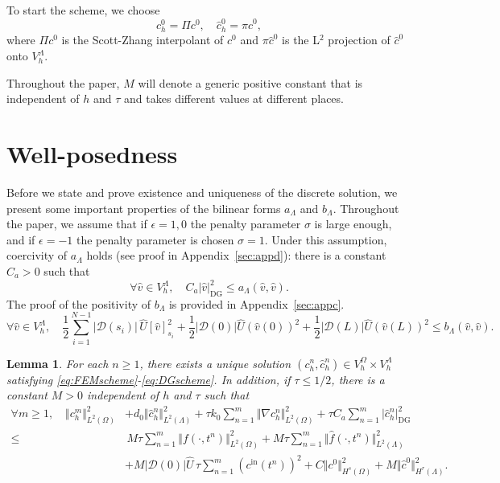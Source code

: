 \documentclass[pdflatex,sn-mathphys-num]{sn-jnl}%
\newcommand{\DG}{\mathrm{DG}}
\theoremstyle{thmstyleone}%
\newtheorem{lemma}[theorem]{Lemma}%
\theoremstyle{thmstyletwo}%
\theoremstyle{thmstylethree}%
\begin{document}
To start the scheme, we choose
\[
c_h^0 = \Pi c^0, \quad \hat c_h^0 = \pi \hat c^0,
\]
where $\Pi c^0$ is the Scott-Zhang interpolant of $c^0$ \cite{ScottZhang} and $\pi \hat c^0$ is the L$^2$ projection of $\hat c^0$ onto $V_h^\Lambda$. 

Throughout the paper, $M$ will denote a generic positive constant that is independent of $h$ and $\tau$ and takes different values at different places.

\section{Well-posedness}
\label{sec:well}

Before we state and prove existence and uniqueness of the discrete solution, we present some important properties of the bilinear forms $a_\Lambda$ and $b_\Lambda$. Throughout the paper, we assume that if $\epsilon = 1, 0$ the penalty parameter $\sigma$ is large enough, and if $\epsilon = -1$ the penalty parameter is chosen $\sigma = 1$. Under this assumption, coercivity of $a_\Lambda$ holds (see proof in Appendix~\ref{sec:appd}): there is a constant $C_a>0$ such that 
\begin{equation}\label{eq:coercivity}
\forall \hat v \in V_h^\Lambda, \quad
C_a \vert \hat v\vert_{\DG}^2 \leq a_{\Lambda}(\hat v, \hat v).
\end{equation}
%
The proof of the positivity of $b_\Lambda$ is provided in Appendix~\ref{sec:appc}. 
\begin{equation}
    \forall \hat v \in V_h^\Lambda, \quad 
\frac12 \sum_{i=1}^{N-1}  \vert \mathcal{D}(s_i)\vert \, \hat U  [\hat v]_{s_i}^2
+ \frac12 \vert \mathcal{D}(0)\vert \hat U (\hat v(0))^2
 +\frac12 \vert \mathcal{D}(L)\vert \hat U (\hat v(L))^2
\leq b_{\Lambda}(\hat v, \hat v).\label{eq:bpositivity}
\end{equation}
%
\begin{lemma}
    For each $n\geq 1$, there exists a unique solution $(c_h^{n}, \hat c_h^{n})\in V_h^\Omega\times V_h^\Lambda$ satisfying \eqref{eq:FEMscheme}-\eqref{eq:DGscheme}.   In addition, %
    if $\tau \leq 1/2$, there is a constant $M>0$ independent of $h$ and $\tau$ such that
\begin{align}
\forall m\geq 1, \quad 
    \Vert c_h^m\Vert_{L^2(\Omega)}^2 
    & +d_0 \Vert \hat c_h^n\Vert_{L^2(\Lambda)}^2 
      +  \tau k_0 \sum_{n=1}^m \Vert \nabla c_h^n \Vert_{L^2(\Omega)}^2
      + \tau C_a \sum_{n=1}^m \vert \hat c_h^n \vert_{\DG}^2 \nonumber\\
        \leq  
        & \, M \tau \sum_{n=1}^m \Vert f(\cdot,t^n)\Vert_{L^2(\Omega)}^2
   + M \tau \sum_{n=1}^m \Vert \hat f(\cdot,t^n) \Vert_{L^2(\Lambda)}^2 
   \nonumber\\
&   + M |\mathcal{D}(0)|\hat U \, \tau \sum_{n=1}^{m}(c^{\mathrm{in}}(t^n))^2
+ C \Vert c^{0}\Vert_{H^s(\Omega)}^2 
+ M \Vert \hat c^{0}\Vert_{H^r(\Lambda)}^2.
\label{eq:stability}
\end{align}
\end{lemma}
\end{document}
